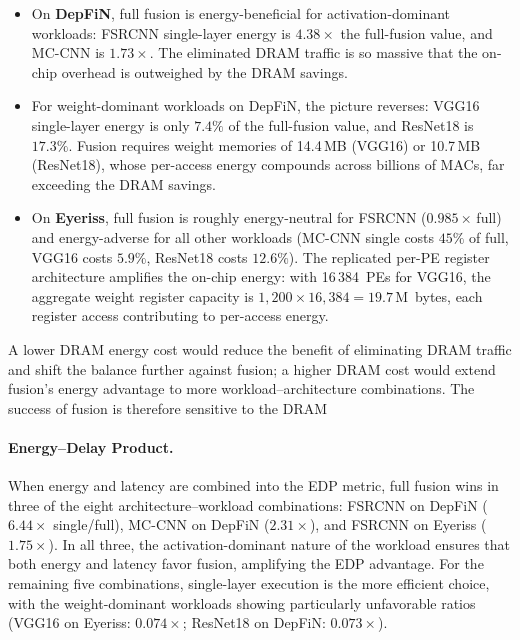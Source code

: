 \begin{itemize}
  \item On \textbf{DepFiN}, full fusion is energy-beneficial for
        activation-dominant workloads: FSRCNN single-layer energy is
        $4.38\times$ the full-fusion value, and MC-CNN is
        $1.73\times$.
        The eliminated DRAM traffic is so massive that the on-chip overhead is
        outweighed by the DRAM savings.
  \item For weight-dominant workloads on DepFiN, the picture
        reverses: VGG16 single-layer energy is only $7.4\%$ of the
        full-fusion value, and ResNet18 is $17.3\%$.
        Fusion requires weight memories of 14.4\,MB (VGG16) or
        10.7\,MB (ResNet18), whose per-access energy compounds
        across billions of MACs, far exceeding the DRAM savings.
  \item On \textbf{Eyeriss}, full fusion is roughly energy-neutral
        for FSRCNN ($0.985\times$\,full) and energy-adverse for all
        other workloads (MC-CNN single costs $45\%$ of full, VGG16
        costs $5.9\%$, ResNet18 costs $12.6\%$).
        The replicated per-PE register architecture amplifies the
        on-chip energy: with 16\,384~PEs for VGG16, the aggregate
        weight register capacity is $1{,}200 \times 16{,}384 =
        19.7$\,M~bytes, each register access contributing to
        per-access energy.
\end{itemize}

\noindent
A lower DRAM energy cost would reduce the benefit of eliminating
DRAM traffic and shift the balance further against fusion; a higher
DRAM cost would extend fusion's energy advantage to more
workload--architecture combinations.
The success of fusion is therefore sensitive to the DRAM

\paragraph{Energy--Delay Product.}
When energy and latency are combined into the EDP metric, full
fusion wins in three of the eight architecture--workload
combinations: FSRCNN on DepFiN ($6.44\times$ single/full), MC-CNN
on DepFiN ($2.31\times$), and FSRCNN on Eyeriss ($1.75\times$).
In all three, the activation-dominant nature of the workload
ensures that both energy and latency favor fusion, amplifying the
EDP advantage.
For the remaining five combinations, single-layer execution is the
more efficient choice, with the weight-dominant workloads showing
particularly unfavorable ratios (VGG16 on Eyeriss:
$0.074\times$; ResNet18 on DepFiN: $0.073\times$).

